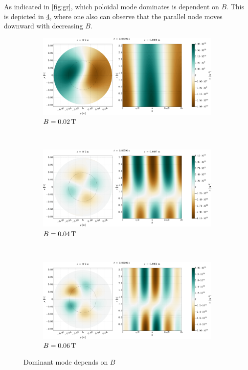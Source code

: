 %
As indicated in \cref{fig:gr}, which poloidal mode dominates is dependent on $B$.
This is depicted in \cref{fig:dominatingMode}, where one also can observe that the parallel node moves downward with decreasing $B$.
%
\begin{figure}[htbp]
    \centering
    \begin{subfigure}[h]{1.00\textwidth}
        \centering
        \includegraphics[width=1.0\textwidth]{fig/results/modesDiffScanVals/B002}
        \caption{$B=0.02 \, \text{T}$}
        \label{fig:B002}
    \end{subfigure}%
    \\
    \begin{subfigure}[h]{1.00\textwidth}
        \centering
        \includegraphics[width=1.0\textwidth]{fig/results/modesDiffScanVals/B004}
        \caption{$B=0.04 \, \text{T}$}
        \label{fig:B004}
    \end{subfigure}
    \\
    \begin{subfigure}[h]{1.00\textwidth}
        \centering
        \includegraphics[width=1.0\textwidth]{fig/results/modesDiffScanVals/B006}
        \caption{$B=0.06 \, \text{T}$}
        \label{fig:B006}
    \end{subfigure}
    \caption{Dominant mode depends on $B$}
    \label{fig:dominatingMode}
\end{figure}
%

